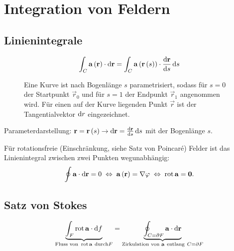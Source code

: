 \section{Integration von Feldern}


\subsection{Linienintegrale}


\begin{equation*}
	\int _{C}\mathbf{a}\left(\mathbf{r}\right)\cdot \mathop{}\!\mathrm{d} \mathbf{r}=\int _{C}\mathbf{a}\left(\mathbf{r}\left(s\right)\right)\cdot \frac{\mathop{}\!\mathrm{d} \mathbf{r}}{\mathop{}\!\mathrm{d} s}\mathop{}\!\mathrm{d} s
\end{equation*}


\begin{figure}[htb]
	\centering
	\tfigCurveIntegral
	\caption{Eine Kurve ist nach Bogenlänge $s$ parametrisiert, sodass für $s=0$ der Startpunkt $\vec r_0$ und für $s=1$ der Endpunkt $\vec r_1$ angenommen wird.
		Für einen auf der Kurve liegenden Punkt $\vec r$ ist der Tangentialvektor $\mathop{}\!\mathrm{d} r$ eingezeichnet. }
	\label{fig:vecanaylsis_curve}
\end{figure}

Parameterdarstellung: $\mathbf{r}=\mathbf{r}\left(s\right)\rightarrow \mathop{}\!\mathrm{d} \mathbf{r}=\frac{\mathop{}\!\mathrm{d} \mathbf{r}}{\mathop{}\!\mathrm{d} s}\mathop{}\!\mathrm{d} s$ mit der Bogenlänge $s$.

Für rotationsfreie (Einschränkung, siehe Satz von Poincaré) Felder ist das Linienintegral zwischen zwei Punkten wegunabhängig:
\begin{equation*}
	\oint \mathbf{a}\cdot \mathop{}\!\mathrm{d} \mathbf{r}=0\;\Leftrightarrow\; \mathbf{a}\left(\mathbf{r}\right)=\nabla \varphi \;\Leftrightarrow\; \operatorname{rot} \mathbf{a}=\mathbf{0}.
\end{equation*}


\subsection{Satz von Stokes}

\begin{equation*}
	\underset{\text{Fluss von }\operatorname{rot} \mathbf{a}~\text{durch} F}{\underbrace{ \int _{F}\operatorname{rot} \mathbf{a}\cdot \mathop{}\!\mathrm{d} f}}=\underset{\text{Zirkulation von }\mathbf{a}~\text{entlang}~ C=\partial F}{\underbrace{\oint _{C=\partial F}\mathbf{a}\cdot \mathop{}\!\mathrm{d} \mathbf{r}}}
\end{equation*}

\begin{figure}[htb]
	\centering
	\tfigHalfSphere
	\caption{}
	\label{fig:vecanaylsis_normal}
\end{figure}


